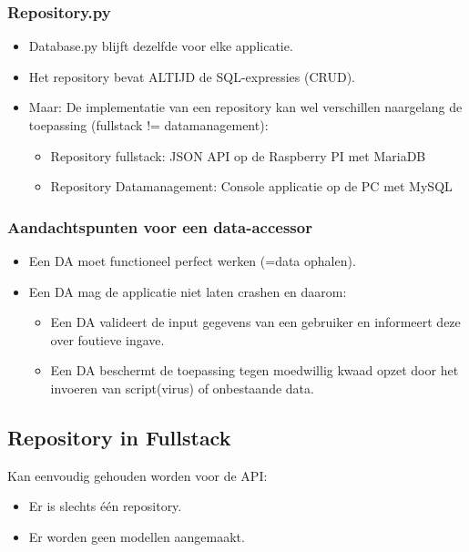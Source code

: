 \documentclass{article}
\begin{document}
\subsubsection{Repository.py}
\begin{itemize}
    \item Database.py blijft dezelfde voor elke applicatie.
    \item Het repository bevat ALTIJD de SQL-expressies (CRUD).
    \item Maar: De implementatie van een repository kan wel verschillen naargelang de toepassing (fullstack != datamanagement):
    \begin{itemize}
        \item Repository fullstack: JSON API op de Raspberry PI met MariaDB
        \item Repository Datamanagement: Console applicatie op de PC met MySQL
    \end{itemize}
\end{itemize}

\subsubsection{Aandachtspunten voor een data-accessor}
\begin{itemize}
    \item Een DA moet functioneel perfect werken (=data ophalen).
    \item Een DA mag de applicatie niet laten crashen en daarom:
    \begin{itemize}
        \item Een DA valideert de input gegevens van een gebruiker en informeert deze over foutieve ingave.
        \item Een DA beschermt de toepassing tegen moedwillig kwaad opzet door het invoeren van script(virus) of onbestaande data.
    \end{itemize}
\end{itemize}


\subsection{Repository in Fullstack}
Kan eenvoudig gehouden worden voor de API:
\begin{itemize}
    \item Er is slechts één repository.
    \item Er worden geen modellen aangemaakt.
\end{itemize}
\end{document}
